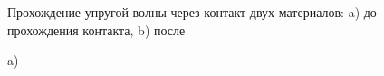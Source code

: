 \begin{figure}
\begin{minipage}{0.35\linewidth}
\end{minipage}
\caption{Прохождение упругой волны через контакт двух материалов: a) до прохождения контакта, b) после}
\label{pic:el-contact}
\end{figure}

\begin{figure}
\begin{minipage}{0.35\linewidth}
 a)\\
\end{minipage}
\hfill
\begin{minipage}{0.35\linewidth}

\end{minipage}
\end{figure}
